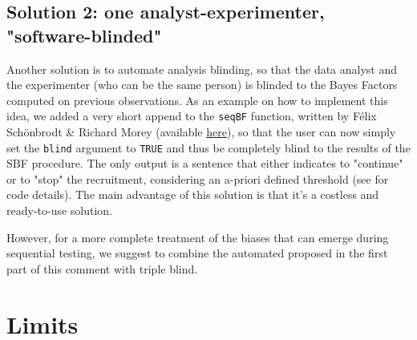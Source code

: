 \documentclass[a4paper,man,natbib,floatsintext,donotrepeattitle]{apa6}
\begin{document}
\subsection{Solution 2: one analyst-experimenter, "software-blinded"}

Another solution is to automate analysis blinding, so that the data analyst and the experimenter (who can be the same person) is blinded to the Bayes Factors computed on previous observations. As an example on how to implement this idea, we added a very short append to the \texttt{seqBF} function, written by Félix Schönbrodt \& Richard Morey (available \href{https://raw.githubusercontent.com/richarddmorey/BayesFactorExtras/master/BayesFactorExtras/R/seqBF.R}{here}), so that the user can now simply set the \texttt{blind} argument to \texttt{TRUE} and thus be completely blind to the results of the SBF procedure. The only output is a sentence that either indicates to "continue" or to "stop" the recruitment, considering an a-priori defined threshold (see  for code details). The main advantage of this solution is that it's a costless and ready-to-use solution.

However, for a more complete treatment of the biases that can emerge during sequential testing, we suggest to combine the automated proposed in the first part of this comment with triple blind.



\section{Limits}
\end{document}
